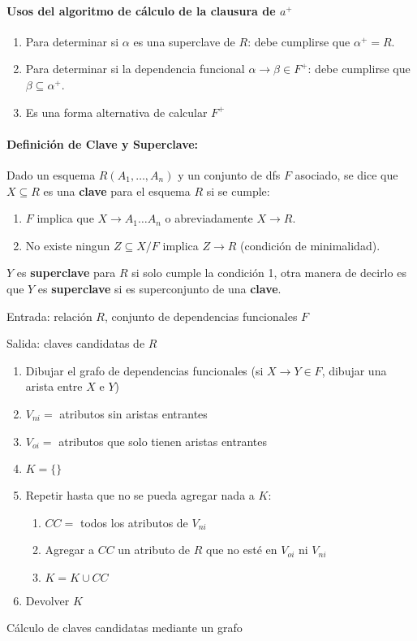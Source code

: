 \documentclass[a4paper, twoside]{article}
\begin{document}
\paragraph{Usos del algoritmo de cálculo de la clausura de $a^{+}$}
\begin{enumerate}
	\item Para determinar si $\alpha$ es una superclave de $R$: debe cumplirse que $\alpha^{+}=R$.
	\item Para determinar si la dependencia funcional $\alpha\to\beta\in F^{+}$: debe cumplirse que $\beta\subseteq\alpha^{+}$.
	\item Es una forma alternativa de calcular $F^{+}$
\end{enumerate}

\paragraph{Definición de Clave y Superclave:}

Dado un esquema $R(A_{1},\dots,A_{n})$ y un conjunto de dfs $F$ asociado, se dice que $X \subseteq R $ es una \textbf{clave} para el esquema $R$ si se cumple:

\begin{enumerate}
	\item $F$ implica que  $X \to A_{1} \dots A_{n}$ o abreviadamente $X \to R$.
	\item No existe ningun $Z \subseteq X / F $ implica $Z \to R $ (condición de minimalidad).
\end{enumerate}

$Y$ es \textbf{superclave} para $R$ si solo cumple la condición 1, otra manera de decirlo es que $Y$ es \textbf{superclave} si es superconjunto de una \textbf{clave}.


\begin{algorithm}[H]
	Entrada: relación $R$, conjunto de dependencias funcionales $F$

	Salida: claves candidatas de $R$
	\begin{enumerate}
		\item Dibujar el grafo de dependencias funcionales (si $X\to Y\in F$, dibujar una arista entre $X$ e $Y$)
		\item $V_{ni}=$ atributos sin aristas entrantes
		\item $V_{oi}=$ atributos que solo tienen aristas entrantes
		\item $K=\{\}$
		\item Repetir hasta que no se pueda agregar nada a $K$:
		\begin{enumerate}
			\item $CC=$ todos los atributos de $V_{ni}$
			\item Agregar a $CC$ un atributo de $R$ que no esté en $V_{oi}$ ni $V_{ni}$
			\item $K=K\cup CC$
		\end{enumerate}
		\item Devolver $K$
	\end{enumerate}
	\caption{Cálculo de claves candidatas mediante un grafo}
\end{algorithm}
\end{document}
